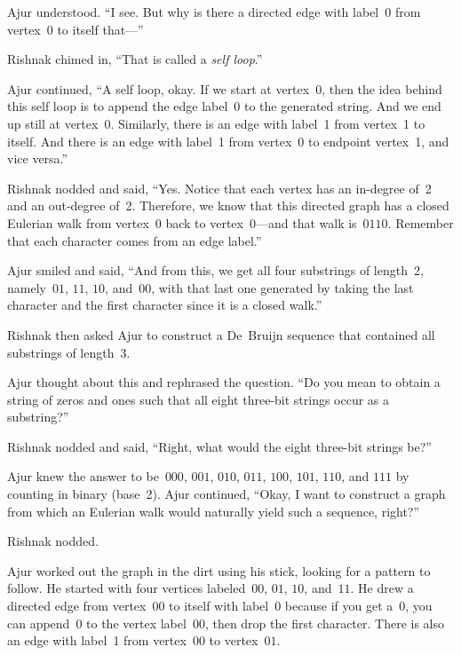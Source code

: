 Ajur understood. ``I see. But why is there a directed edge with label~0 from vertex~0 to itself that---''

Rishnak chimed in, ``That is called a \textit{self loop}.''

Ajur continued, ``A self loop, okay. If we start at vertex~0, then the idea behind this self loop is to append the edge label~0 to the generated string. And we end up still at vertex~0. Similarly, there is an edge with label~1 from vertex~1 to itself. And there is an edge with label~1 from vertex~0 to endpoint vertex~1, and vice versa.''

Rishnak nodded and said, ``Yes. Notice that each vertex has an in-degree of~2 and an out-degree of~2. Therefore, we know that this directed graph has a closed Eulerian walk from vertex~0 back to vertex~0---and that walk is~$0110$. Remember that each character comes from an edge label.''

Ajur smiled and said, ``And from this, we get all four substrings of length~2, namely~$01$, $11$, $10$, and~$00$, with that last one generated by taking the last character and the first character since it is a closed walk.''

Rishnak then asked Ajur to construct a De~Bruijn sequence that contained all substrings of length~3.

Ajur thought about this and rephrased the question. ``Do you mean to obtain a string of zeros and ones such that all eight three-bit strings occur as a substring?''

Rishnak nodded and said, ``Right, what would the eight three-bit strings be?''

Ajur knew the answer to be~$000$, $001$, $010$, $011$, $100$, $101$, $110$, and $111$ by counting in binary (base~2).
Ajur continued, ``Okay, I want to construct a graph from which an Eulerian walk would naturally yield such a sequence, right?''

Rishnak nodded.

Ajur worked out the graph in the dirt using his stick, looking for a pattern to follow.
He started with four vertices labeled~$00$, $01$, $10$, and~$11$.
He drew a directed edge from vertex~$00$ to itself with label~0 because if you get a~0, you can append~0 to the vertex label~$00$, then drop the first character. There is also an edge with label~1 from vertex~$00$ to vertex~$01$.

